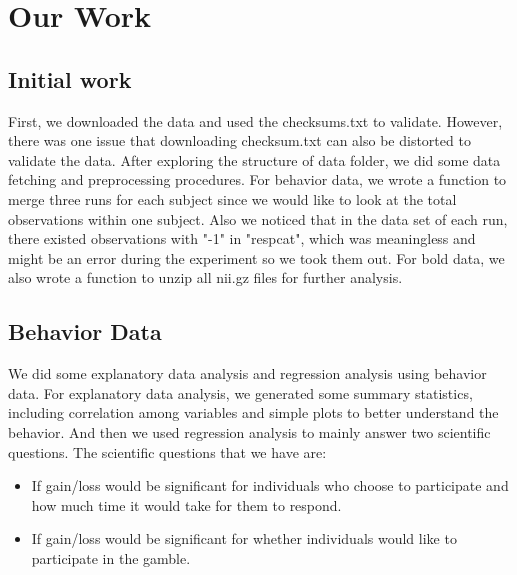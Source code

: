 \section{Our Work}
\subsection{Initial work}
\noindent
First, we downloaded the data and used the checksums.txt to validate. However,
there was one issue that downloading checksum.txt can also be distorted to
validate the data. After exploring the structure of data folder, we did some 
data fetching and preprocessing procedures. For behavior data, we wrote a 
function to merge three runs for each subject since we would like to look at 
the total observations within one subject. Also we noticed that in the data set
of each run, there existed observations with "-1" in "respcat", which was 
meaningless and might be an error during the experiment so we took them out.
For bold data, we also wrote a function to unzip all nii.gz files for further
analysis.

\subsection{Behavior Data}
\noindent
We did some explanatory data analysis and regression analysis using behavior 
data. For explanatory data analysis, we generated some summary statistics, 
including correlation among variables and simple plots to better understand 
the behavior. And then we used regression analysis to mainly answer two 
scientific questions. The scientific questions that we have are:
\begin{itemize}
\item If gain/loss would be significant for individuals who choose to 
participate and how much time it would take for them to respond.
\item If gain/loss would be significant for whether individuals would like to 
participate in the gamble. 
\end {itemize}

